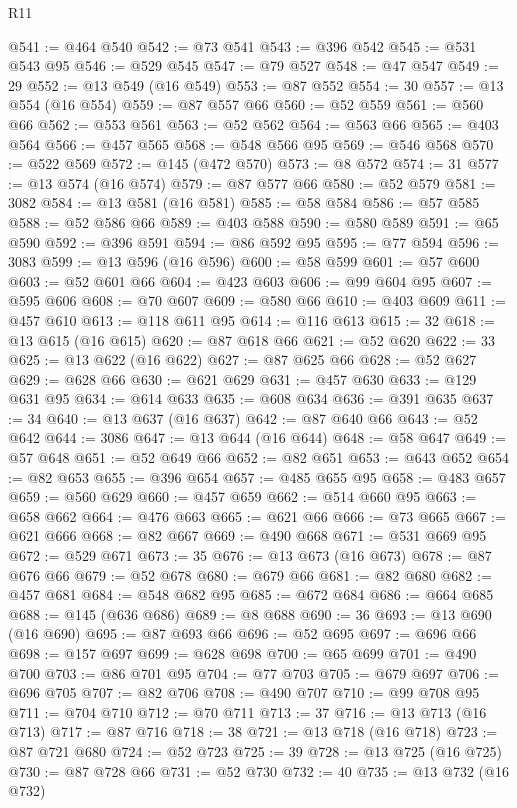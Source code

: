 \begin{lexlean}{R11}
\begin{coremodule}
@541 := @464 @540
@542 := @73 @541
@543 := @396 @542
@545 := @531 @543 @95
@546 := @529 @545
@547 := @79 @527
@548 := @47 @547
@549 := 29
@552 := @13 @549 (@16 @549)
@553 := @87 @552
@554 := 30
@557 := @13 @554 (@16 @554)
@559 := @87 @557 @66
@560 := @52 @559
@561 := @560 @66
@562 := @553 @561
@563 := @52 @562
@564 := @563 @66
@565 := @403 @564
@566 := @457 @565
@568 := @548 @566 @95
@569 := @546 @568
@570 := @522 @569
@572 := @145 (@472 @570)
@573 := @8 @572
@574 := 31
@577 := @13 @574 (@16 @574)
@579 := @87 @577 @66
@580 := @52 @579
@581 := 3082
@584 := @13 @581 (@16 @581)
@585 := @58 @584
@586 := @57 @585
@588 := @52 @586 @66
@589 := @403 @588
@590 := @580 @589
@591 := @65 @590
@592 := @396 @591
@594 := @86 @592 @95
@595 := @77 @594
@596 := 3083
@599 := @13 @596 (@16 @596)
@600 := @58 @599
@601 := @57 @600
@603 := @52 @601 @66
@604 := @423 @603
@606 := @99 @604 @95
@607 := @595 @606
@608 := @70 @607
@609 := @580 @66
@610 := @403 @609
@611 := @457 @610
@613 := @118 @611 @95
@614 := @116 @613
@615 := 32
@618 := @13 @615 (@16 @615)
@620 := @87 @618 @66
@621 := @52 @620
@622 := 33
@625 := @13 @622 (@16 @622)
@627 := @87 @625 @66
@628 := @52 @627
@629 := @628 @66
@630 := @621 @629
@631 := @457 @630
@633 := @129 @631 @95
@634 := @614 @633
@635 := @608 @634
@636 := @391 @635
@637 := 34
@640 := @13 @637 (@16 @637)
@642 := @87 @640 @66
@643 := @52 @642
@644 := 3086
@647 := @13 @644 (@16 @644)
@648 := @58 @647
@649 := @57 @648
@651 := @52 @649 @66
@652 := @82 @651
@653 := @643 @652
@654 := @82 @653
@655 := @396 @654
@657 := @485 @655 @95
@658 := @483 @657
@659 := @560 @629
@660 := @457 @659
@662 := @514 @660 @95
@663 := @658 @662
@664 := @476 @663
@665 := @621 @66
@666 := @73 @665
@667 := @621 @666
@668 := @82 @667
@669 := @490 @668
@671 := @531 @669 @95
@672 := @529 @671
@673 := 35
@676 := @13 @673 (@16 @673)
@678 := @87 @676 @66
@679 := @52 @678
@680 := @679 @66
@681 := @82 @680
@682 := @457 @681
@684 := @548 @682 @95
@685 := @672 @684
@686 := @664 @685
@688 := @145 (@636 @686)
@689 := @8 @688
@690 := 36
@693 := @13 @690 (@16 @690)
@695 := @87 @693 @66
@696 := @52 @695
@697 := @696 @66
@698 := @157 @697
@699 := @628 @698
@700 := @65 @699
@701 := @490 @700
@703 := @86 @701 @95
@704 := @77 @703
@705 := @679 @697
@706 := @696 @705
@707 := @82 @706
@708 := @490 @707
@710 := @99 @708 @95
@711 := @704 @710
@712 := @70 @711
@713 := 37
@716 := @13 @713 (@16 @713)
@717 := @87 @716
@718 := 38
@721 := @13 @718 (@16 @718)
@723 := @87 @721 @680
@724 := @52 @723
@725 := 39
@728 := @13 @725 (@16 @725)
@730 := @87 @728 @66
@731 := @52 @730
@732 := 40
@735 := @13 @732 (@16 @732)

\end{coremodule}
\end{lexlean}

